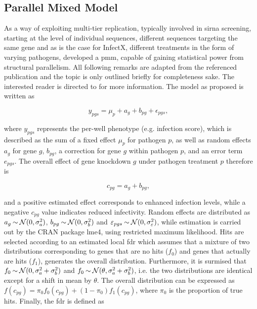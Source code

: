 \subsection{Parallel Mixed Model}
As a way of exploiting multi-tier replication, typically involved in \gls{sirna} screening, starting at the level of individual sequences, different sequences targeting the same gene and as is the case for InfectX, different treatments in the form of varying pathogens, \citeauthor{Ramo2014} developed a \acrfull{pmm}, capable of gaining statistical power from structural parallelism. All following remarks are adapted from the referenced publication and the topic is only outlined briefly for completeness sake. The interested reader is directed to \cite{Ramo2014} for more information. The model as proposed is written as

\begin{equation}
  y_{pgs} = \mu_p + a_g + b_{pg} + \epsilon_{pgs},
\end{equation}

where $y_{pgs}$ represents the per-well phenotype (e.g. infection score), which is described as the sum of a fixed effect $\mu_p$ for pathogen $p$, as well as random effects $a_g$ for gene $g$, $b_{pg}$, a correction for gene $g$ within pathogen $p$, and an error term $e_{pgs}$. The overall effect of gene knockdown $g$ under pathogen treatment $p$ therefore is 

\begin{equation}
  c_{pg} = a_g + b_{pg},
\end{equation}

and a positive estimated effect corresponds to enhanced infection levels, while a negative $c_{pg}$ value indicates reduced infectivity. Random effects are distributed as $a_g \mathbin{\sim} \operatorname{\mathcal{N}}(0, \sigma_a^2)$, $b_{pg} \mathbin{\sim} \operatorname{\mathcal{N}}(0, \sigma_b^2)$ and $\varepsilon_{pgs} \mathbin{\sim} \operatorname{\mathcal{N}}(0, \sigma_\varepsilon^2)$, while estimation is carried out by the CRAN package lme4, using restricted maximum likelihood. Hits are selected according to an estimated local \gls{fdr} which assumes that a mixture of two distributions corresponding to genes that are no hits ($f_0$) and genes that actually are hits ($f_1$), generates the overall distribution. Furthermore, it is surmised that $f_0 \mathbin{\sim} \operatorname{\mathcal{N}}(0, \sigma_a^2+\sigma_b^2)$ and $f_0 \mathbin{\sim} \operatorname{\mathcal{N}}(\theta, \sigma_a^2+\sigma_b^2)$, i.e. the two distributions are identical except for a shift in mean by $\theta$. The overall distribution can be expressed as $f(c_{pg}) = \pi_0 f_0(c_{pg}) + (1-\pi_0) f_1(c_{pg})$, where $\pi_0$ is the proportion of true hits. Finally, the \gls{fdr} is defined as

